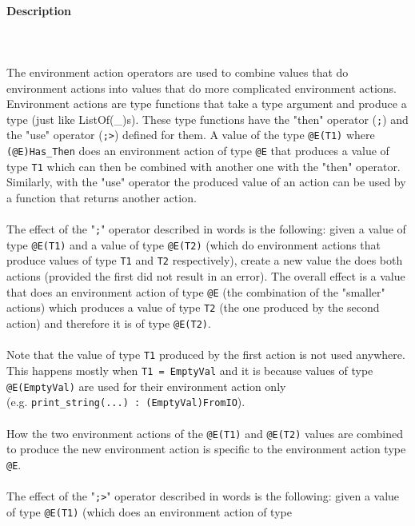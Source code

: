 \documentclass{article}
\begin{document}
\paragraph{Description}\mbox{} \\\\
The environment action operators are used to combine values that do environment
actions into values that do more complicated environment actions. Environment
actions are type functions that take a type argument and produce a type (just
like ListOf(_)s). These type functions have the "then" operator (\texttt{;}) and
the "use" operator (\texttt{;>}) defined for them.  A value of the type
\texttt{@E(T1)} where \texttt{(@E)Has_Then} does an environment action of type
\texttt{@E} that produces a value of type \texttt{T1} which can then be combined
with another one with the "then" operator. Similarly, with the "use" operator
the produced value of an action can be used by a function that returns another
action.
\\\\
The effect of the "\texttt{;}" operator described in words is the following:
given a value of type \texttt{@E(T1)} and a value of type \texttt{@E(T2)} (which
do environment actions that produce values of type \texttt{T1} and \texttt{T2}
respectively), create a new value the does both actions (provided the first did
not result in an error).  The overall effect is a value that does an
environment action of type \texttt{@E} (the combination of the "smaller"
actions) which produces a value of type \texttt{T2} (the one produced by the second
action) and therefore it is of type \texttt{@E(T2)}.
\\\\
Note that the value of type \texttt{T1} produced by the first action is not used
anywhere. This happens mostly when \texttt{T1 = EmptyVal} and it is 
because values of type \texttt{@E(EmptyVal)} are used for their environment
action only \\(e.g. \texttt{print_string(...)\ :\ (EmptyVal)FromIO}).
\\\\
How the two environment actions of the \texttt{@E(T1)} and \texttt{@E(T2)} values
are combined to produce the new environment action is specific to the
environment action type \texttt{@E}.
\\\\
The effect of the "\texttt{;>}" operator described in words is the following:
given a value of type \texttt{@E(T1)} (which does an environment action of type
\end{document}
